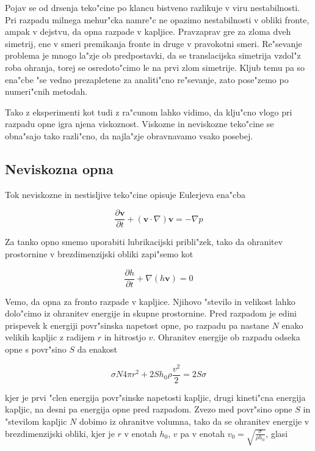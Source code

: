 \documentclass[a4paper,12pt]{article}
\renewcommand{\vec}{\mathbf}
\newcommand{\odv}[1]{\frac{\partial #1}{\partial t}}
\begin{document}
Pojav se od drsenja teko"cine po klancu bistveno razlikuje v viru nestabilnosti. Pri razpadu milnega mehur"cka namre"c ne opazimo nestabilnosti v obliki fronte, ampak v dejstvu, da opna razpade v kapljice. Pravzaprav gre za zloma dveh simetrij, ene v smeri premikanja fronte in druge v pravokotni smeri. Re"sevanje problema je mnogo la"zje ob predpostavki, da se translacijska simetrija vzdol"z roba ohranja, torej se osredoto"cimo le na prvi zlom simetrije. Kljub temu pa so ena"cbe "se vedno prezapletene za analiti"cno re"sevanje, zato pose"zemo po numeri"cnih metodah. 

Tako z eksperimenti kot tudi z ra"cunom lahko vidimo, da klju"cno vlogo pri razpadu opne igra njena viskoznost. Viskozne in neviskozne teko"cine se obna"sajo tako razli"cno, da najla"zje obravnavamo vsako posebej. 

\subsection{Neviskozna opna}
Tok neviskozne in nestisljive teko"cine opisuje Eulerjeva ena"cba

\begin{equation}
\label{eq:meh-euler}
 \odv{\vec v} + (\vec v \cdot \nabla)\vec v = - \nabla p
\end{equation}

Za tanko opno smemo uporabiti lubrikacijski pribli"zek, tako da ohranitev prostornine v brezdimenzijski obliki zapi"semo kot

\begin{equation}
\label{eq:meh-ohranitev}
 \odv{h} + \nabla (h\vec v) = 0
\end{equation}

Vemo, da opna za fronto razpade v kapljice. Njihovo "stevilo in velikost lahko dolo"cimo iz ohranitev energije in skupne prostornine. Pred razpadom je edini prispevek k energiji povr"sinska napetost opne, po razpadu pa nastane $N$ enako velikih kapljic z radijem $r$ in hitrostjo $v$. Ohranitev energije ob razpadu odseka opne s povr"sino $S$ da enakost

\begin{equation}
 \sigma N 4 \pi r^2 + 2 S h_0 \rho \frac{v^2}{2} = 2S\sigma
\end{equation}

kjer je prvi "clen energija povr"sinske napetosti kapljic, drugi kineti"cna energija kapljic, na desni pa energija opne pred razpadom. Zvezo med povr"sino opne $S$ in "stevilom kapljic $N$ dobimo iz ohranitve volumna, tako da se ohranitev energije v brezdimenzijski obliki, kjer je $r$ v enotah $h_0$, $v$ pa v enotah $v_0 = \sqrt{\frac{\sigma}{\rho h_0}}$, glasi
\end{document}

